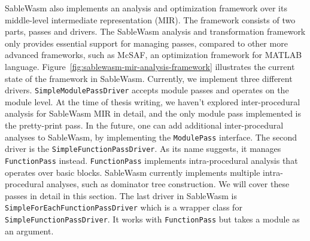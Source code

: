 SableWasm also implements an analysis and optimization framework over its
middle-level intermediate representation (MIR). The framework consists of two
parts, passes and drivers. The SableWasm analysis and transformation framework
only provides essential support for managing passes, compared to other more
advanced frameworks, such as McSAF\cite{mcsaf}, an optimization framework for
MATLAB language. Figure~\ref{fig:sablewasm-mir-analysis-framework} illustrates
the current state of the framework in SableWasm. Currently, we implement three
different drivers. \texttt{SimpleModulePassDriver} accepts module passes and
operates on the module level. At the time of thesis writing, we haven't explored
inter-procedural analysis for SableWasm MIR in detail, and the only module pass
implemented is the pretty-print pass. In the future, one can add additional
inter-procedural analyses to SableWasm, by implementing the \texttt{ModulePass}
interface. The second driver is the \texttt{SimpleFunctionPassDriver}. As its
name suggests, it manages \texttt{FunctionPass} instead. \texttt{FunctionPass}
implements intra-procedural analysis that operates over basic blocks. SableWasm
currently implements multiple intra-procedural analyses, such as dominator tree
construction. We will cover these passes in detail in this section. The last
driver in SableWasm is \texttt{SimpleForEachFunctionPassDriver} which is a
wrapper class for \texttt{SimpleFunctionPassDriver}. It works with
\texttt{FunctionPass} but takes a module as an argument.



